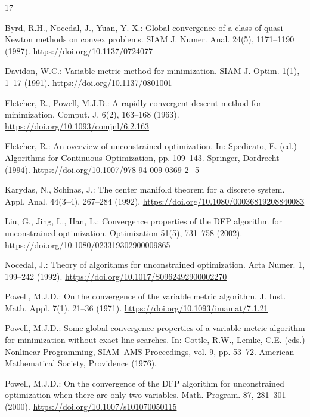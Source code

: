 \documentclass[11pt]{article}
\begin{document}
\begin{thebibliography}{17}

Byrd, R.H., Nocedal, J., Yuan, Y.-X.:
Global convergence of a class of quasi-Newton methods on convex problems.
SIAM J. Numer. Anal. 24(5), 1171--1190 (1987).
\url{https://doi.org/10.1137/0724077}

Davidon, W.C.:
Variable metric method for minimization.
SIAM J. Optim. 1(1), 1--17 (1991).
\url{https://doi.org/10.1137/0801001}

Fletcher, R., Powell, M.J.D.:
A rapidly convergent descent method for minimization.
Comput. J. 6(2), 163--168 (1963).
\url{https://doi.org/10.1093/comjnl/6.2.163}

Fletcher, R.:
An overview of unconstrained optimization.
In: Spedicato, E. (ed.) Algorithms for Continuous Optimization,
pp. 109--143.
Springer, Dordrecht (1994).
\url{https://doi.org/10.1007/978-94-009-0369-2_5}

Karydas, N., Schinas, J.:
The center manifold theorem for a discrete system.
Appl. Anal. 44(3--4), 267--284 (1992).
\url{https://doi.org/10.1080/00036819208840083}

Liu, G., Jing, L., Han, L.:
Convergence properties of the DFP algorithm for unconstrained optimization.
Optimization 51(5), 731--758 (2002).
\url{https://doi.org/10.1080/023319302900009865}

Nocedal, J.:
Theory of algorithms for unconstrained optimization.
Acta Numer. 1, 199--242 (1992).
\url{https://doi.org/10.1017/S0962492900002270}

Powell, M.J.D.:
On the convergence of the variable metric algorithm.
J. Inst. Math. Appl. 7(1), 21--36 (1971).
\url{https://doi.org/10.1093/imamat/7.1.21}

Powell, M.J.D.:
Some global convergence properties of a variable metric algorithm for
minimization without exact line searches.
In: Cottle, R.W., Lemke, C.E. (eds.) Nonlinear Programming,
SIAM--AMS Proceedings, vol. 9, pp. 53--72.
American Mathematical Society, Providence (1976).

Powell, M.J.D.:
On the convergence of the DFP algorithm for unconstrained optimization when
there are only two variables.
Math. Program. 87, 281--301 (2000).
\url{https://doi.org/10.1007/s101070050115}


\end{thebibliography}
\end{document}
